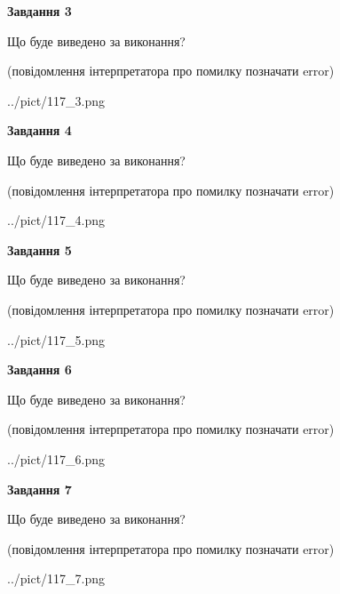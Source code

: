 \documentclass[12pt, ukrainian]{article}
\begin{document}
{\begin {large}
{\begin {center}\textbf{Завдання 3}\end {center}}\par
Що буде виведено за виконання?\par
 (повідомлення інтерпретатора про помилку позначати error)\par
\begin{center}
	{../pict/117_3.png}
\end{center}
\newpage

{\begin {center}\textbf{Завдання 4}\end {center}}\par
Що буде виведено за виконання?\par
 (повідомлення інтерпретатора про помилку позначати error)\par
\begin{center}
	{../pict/117_4.png}
\end{center}
\newpage

{\begin {center}\textbf{Завдання 5}\end {center}}\par
Що буде виведено за виконання?\par
 (повідомлення інтерпретатора про помилку позначати error)\par
\begin{center}
	{../pict/117_5.png}
\end{center}
\newpage

{\begin {center}\textbf{Завдання 6}\end {center}}\par
Що буде виведено за виконання?\par
 (повідомлення інтерпретатора про помилку позначати error)\par
\begin{center}
	{../pict/117_6.png}
\end{center}
\newpage

{\begin {center}\textbf{Завдання 7}\end {center}}\par
Що буде виведено за виконання?\par
 (повідомлення інтерпретатора про помилку позначати error)\par
\begin{center}
	{../pict/117_7.png}
\end{center}
\newpage


\end{large}}
\end{document}
